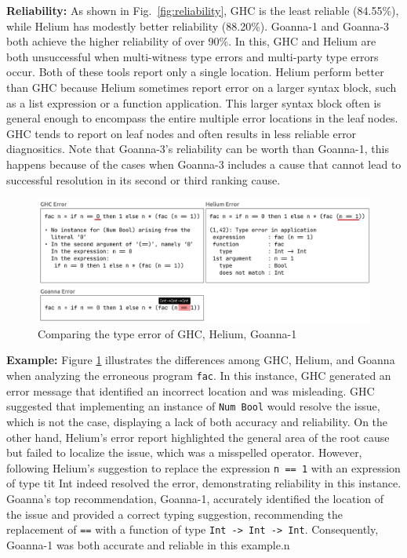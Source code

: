 \documentclass[pdflatex,lineno,sn-nature,Numbered]{sn-jnl}%
\begin{document}
\textbf{Reliability:} As shown in Fig.~\ref{fig:reliability}, GHC is the least reliable (84.55\%), while Helium has modestly better reliability (88.20\%). Goanna-1 and Goanna-3 both achieve the higher reliability of over 90\%. In this, GHC and Helium are both unsuccessful when multi-witness type errors and multi-party type errors occur. Both of these tools report only a single location. Helium perform better than GHC because Helium sometimes report error on a larger syntax block, such as a list expression or a function application. This larger syntax block often is general enough to encompass the entire multiple error locations in the leaf nodes. GHC tends to report on leaf nodes and often results in less reliable error diagnositics. Note that Goanna-3's reliability can be worth than Goanna-1, this happens because of the cases when Goanna-3 includes a cause that cannot lead to successful resolution in its second or third ranking cause. 
    \begin{figure}
        \centering
        \includegraphics[width=\linewidth]{images/ErrorCompare}
        \caption{Comparing the type error of GHC, Helium, Goanna-1}
        \label{fig:error-compare}
    \end{figure}


\textbf{Example:} Figure \ref{fig:error-compare} illustrates the differences among GHC, Helium, and Goanna when analyzing the erroneous program {\tt fac}. In this instance, GHC generated an error message that identified an incorrect location and was misleading. GHC suggested that implementing an instance of {\tt Num Bool} would resolve the issue, which is not the case, displaying a lack of both accuracy and reliability. On the other hand, Helium's error report highlighted the general area of the root cause but failed to localize the issue, which was a misspelled operator. However, following Helium's suggestion to replace the expression {\tt n == 1} with an expression of type {tit Int} indeed resolved the error, demonstrating reliability in this instance. Goanna's top recommendation, Goanna-1, accurately identified the location of the issue and provided a correct typing suggestion, recommending the replacement of {\tt ==} with a function of type {\tt Int -> Int -> Int}. Consequently, Goanna-1 was both accurate and reliable in this example.n
    
\end{document}
